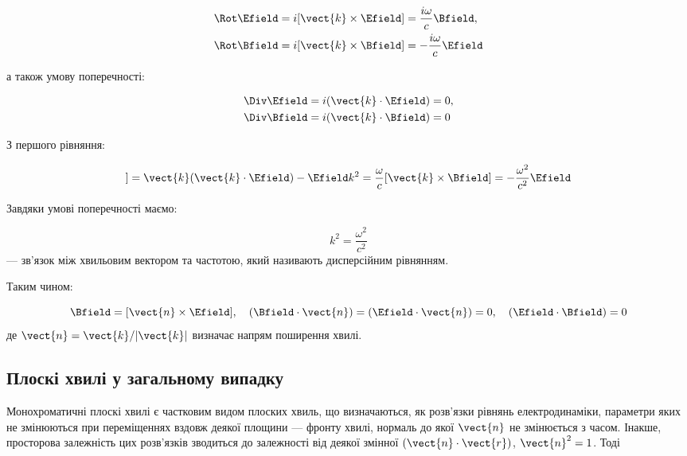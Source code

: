 \begin{align*}
\Rot\Efield &= i[\vect{k} \times \Efield] = \frac{i\omega}{c} \Bfield, \\
\Rot\Bfield &= i[\vect{k} \times \Bfield] = -\frac{i\omega}{c} \Efield
\end{align*}

а також умову поперечності:

\begin{align*}
\Div\Efield &= i(\vect{k} \cdot \Efield) = 0, \\
\Div\Bfield &= i(\vect{k} \cdot \Bfield) = 0
\end{align*}

З першого рівняння:

\begin{equation*}
[\vect{k} \times [\vect{k} \times \Efield]] = \vect{k}(\vect{k} \cdot \Efield) - \Efield k^2 = \frac{\omega}{c}[\vect{k} \times \Bfield] =
-\frac{\omega^2}{c^2} \Efield
\end{equation*}

Завдяки умові поперечності маємо:

\begin{equation*}
k^2 = \frac{\omega^2}{c^2}
\label{eq:dispersion_relation}
\end{equation*}
--- зв’язок між хвильовим вектором та частотою, який називають дисперсійним рівнянням.

Таким чином:

\begin{equation*}
\Bfield = [\vect{n} \times \Efield], \quad (\Bfield \cdot \vect{n}) = (\Efield \cdot \vect{n}) = 0, \quad (\Efield \cdot \Bfield) = 0
\label{eq:wave_properties}
\end{equation*}
де \(\vect{n} = \vect{k} / |\vect{k}|\) визначає напрям поширення хвилі.

\subsection*{Плоскі хвилі у загальному випадку}

Монохроматичні плоскі хвилі є частковим видом плоских хвиль, що визначаються, як розв’язки рівнянь електродинаміки, параметри яких не
змінюються при переміщеннях вздовж деякої площини --- фронту хвилі, нормаль до якої \(\vect{n}\) не змінюється з часом. Інакше, просторова залежність
цих розв’язків зводиться до залежності від деякої змінної \((\vect{n} \cdot \vect{r})\), \(\vect{n}^2 = 1\). Тоді

